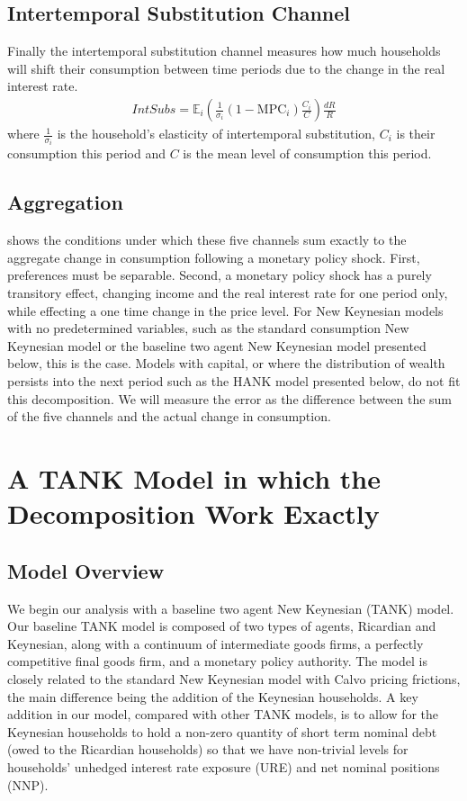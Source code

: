 \documentclass[titlepage]{\econtex}\newcommand{\texname}{ConsumptionHeterogeneity}
\begin{document}
\subsection{Intertemporal Substitution Channel}
Finally the intertemporal substitution channel measures how much households will shift their consumption between time periods due to the change in the real interest rate.
\begin{align}
\textit{IntSubs} = \mathbb{E}_i \left( \frac{1}{\sigma_i} (1-\text{MPC}_i) \frac{C_i}{C}  \right) \frac{dR}{R}
\end{align}
where $\frac{1}{\sigma_i}$ is the household's elasticity of intertemporal substitution, $C_i$ is their consumption this period and $C$ is the mean level of consumption this period.

\subsection{Aggregation}
\cite{auclert_monetary_2017} shows the conditions under which these five channels sum exactly to the aggregate change in consumption following a monetary policy shock. First, preferences must be separable. Second, a monetary policy shock has a purely transitory effect, changing income and the real interest rate for one period only, while effecting a one time change in the price level. For New Keynesian models with no predetermined variables, such as the standard consumption New Keynesian model or the baseline two agent New Keynesian model presented below, this is the case. Models with capital, or where the distribution of wealth persists into the next period such as the HANK model presented below, do not fit this decomposition. We will measure the error as the difference between the sum of the five channels and the actual change in consumption.


\section{A TANK Model in which the Decomposition Work Exactly}

\subsection{Model Overview}
We begin our analysis with a baseline two agent New Keynesian (TANK) model. Our baseline TANK model is composed of two types of agents, Ricardian and Keynesian, along with a continuum of intermediate goods firms, a perfectly competitive final goods firm, and a monetary policy authority. The model is closely related to the standard New Keynesian model with Calvo pricing frictions, the main difference being the addition of the Keynesian households. A key addition in our model, compared with other TANK models, is to allow for the Keynesian households to hold a non-zero quantity of short term nominal debt (owed to the Ricardian households) so that we have non-trivial levels for households' unhedged interest rate exposure (URE) and net nominal positions (NNP).
\end{document}
